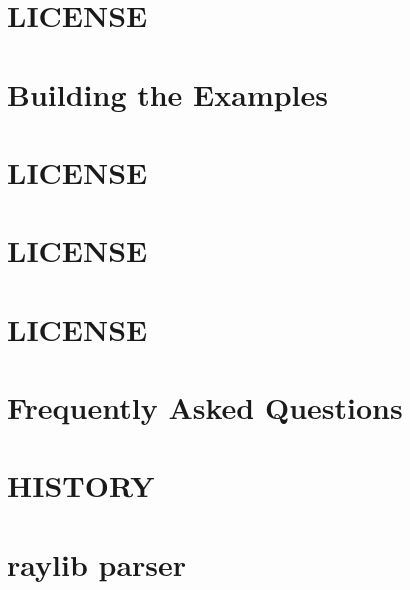 \let\mypdfximage\pdfximage\def\pdfximage{\immediate\mypdfximage}\documentclass[twoside]{book}
\newcommand{\+}{\discretionary{\mbox{\scriptsize$\hookleftarrow$}}{}{}}
\begin{document}
\chapter{LICENSE}
\label{md_build__deps_raylib_src_examples_models_resources_LICENSE}

\chapter{Building the Examples}
\label{md_build__deps_raylib_src_examples_README}

\chapter{LICENSE}
\label{md_build__deps_raylib_src_examples_shaders_resources_LICENSE}

\chapter{LICENSE}
\label{md_build__deps_raylib_src_examples_text_resources_LICENSE}

\chapter{LICENSE}
\label{md_build__deps_raylib_src_examples_textures_resources_LICENSE}

\chapter{Frequently Asked Questions}
\label{md_build__deps_raylib_src_FAQ}

\chapter{HISTORY}
\label{md_build__deps_raylib_src_HISTORY}

\chapter{raylib parser}
\label{md_build__deps_raylib_src_parser_README}

\end{document}
